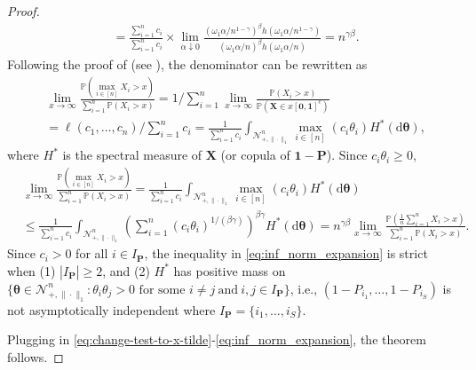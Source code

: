 \documentclass[12pt]{article}
\theoremstyle{plain}
\theoremstyle{plain}
\theoremstyle{definition}
\renewcommand{\Pr}{\mathbb{P}}
\newcommand{\intd}{\mathrm{d}}
\newcommand{\punitsphereone}[1]{\mathcal{N}_{+,\|\cdot\|_1}^{#1}}
\begin{document}
\begin{proof}
\begin{align*}
&=\frac{\sum_{i=1}^n c_i}{\sum_{i=1}^n c_i}\times\lim_{\alpha\downarrow0}\frac{(\omega_1\alpha/n^{1-\gamma})^\beta h(\omega_1\alpha/n^{1-\gamma})}{\left(\omega_1{\alpha}/{n}\right)^\beta h(\omega_1\alpha/n)}
=n^{\gamma\beta}.
\end{align*}
Following the proof of  (see ), the denominator can be rewritten as
\begin{equation*}
\label{eq:max-prob-tail}
\begin{split}
&\lim_{x\to\infty}\frac{\Pr(\max_{i\in[n]}{X}_i>x)}{\sum_{i=1}^n\Pr({X}_i>x)}
=1\bigg/\sum_{i=1}^n\lim_{x\to\infty}\frac{\Pr({X}_i>x)}{\Pr({\mathbf{X}}\in x[\mathbf{0},\mathbf{1}]^c)}\\
&=\ell(c_1,\dots,c_n)/\sum_{i=1}^n c_i
=\frac{1}{\sum_{i=1}^n c_i}\int_{\punitsphereone{n}} \max_{i\in[n]}(c_i\theta_i)H^*(\intd\bm{\theta}),
\end{split}
\end{equation*}
where $H^*$ is the spectral measure of ${\mathbf{X}}$ (or copula of $\mathbf{1}-\mathbf{P}$). Since $c_i\theta_i\ge0$,
\begin{equation}
\label{eq:inf_norm_expansion}
\begin{split}
&\lim_{x\to\infty}\frac{\Pr(\max_{i\in[n]}{X}_i>x)}{\sum_{i=1}^n\Pr({X}_i>x)}
=\frac{1}{\sum_{i=1}^nc_i}\int_{\punitsphereone{n}}\max_{i\in[n]}(c_i\theta_i)H^*(\intd\bm{\theta})\\
&\le\frac{1}{\sum_{i=1}^nc_i}\int_{\punitsphereone{n}}\left(\sum_{i=1}^n(c_i\theta_i)^{1/(\beta\gamma)} \right)^{\beta\gamma} H^*(\intd\bm{\theta})
=n^{\gamma\beta}\lim_{x\to\infty}\frac{\Pr(\frac{1}{n}\sum_{i=1}^n {X}_i>x)}{\sum_{i=1}^n\Pr({X}_i>x)}.
\end{split}
\end{equation}
Since $c_i>0$ for all $i\in I_{\mathbf{P}}$, the inequality in \eqref{eq:inf_norm_expansion} is strict when (1) $|I_{\mathbf{P}}|\ge2$, and (2) $H^*$ has positive mass on $\{\bm{\theta}\in \punitsphereone{n}: \theta_i \theta_j>0  \mbox{~for some~} i\neq j~\mathrm{and}~i,j\in I_{\mathbf{P}}\}$, i.e., $(1-P_{i_1},\dots,1-P_{i_S})$ is not asymptotically independent where $I_{\mathbf{P}}=\{i_1,\dots,i_S\}$. 

Plugging in \eqref{eq:change-test-to-x-tilde}-\eqref{eq:inf_norm_expansion}, the theorem follows.
\end{proof}
\end{document}
